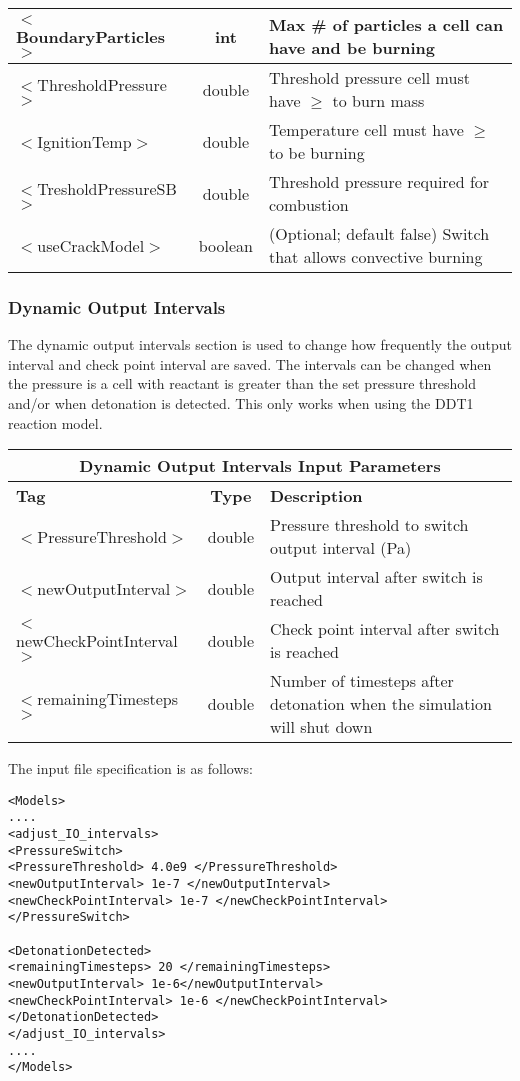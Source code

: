 \begin{center}
\begin{tabular}{| l | c | p{7cm} |}
\hline
  $<$BoundaryParticles$>$ & int & Max \# of particles a cell can have and be burning  \\
\hline
  $<$ThresholdPressure$>$ & double & Threshold pressure cell must have $\ge$ to burn mass \\
\hline
  $<$IgnitionTemp$>$ & double & Temperature cell must have $\ge$ to be burning \\
\hline
  $<$TresholdPressureSB$>$ & double & Threshold pressure required for combustion \\
\hline
  $<$useCrackModel$>$ & boolean & (Optional; default false) Switch that allows convective burning \\
\hline
\end{tabular}
\end{center}



\newpage
\subsubsection{Dynamic Output Intervals} \label {Sec:DDT2}
The dynamic output intervals section is used to change how frequently the output interval and check point interval are saved. The intervals can be changed when the pressure is a cell with reactant is greater than the set pressure threshold and/or when detonation is detected. This only works when using the DDT1 reaction model.


\begin{center}
\begin{tabular}{| l | c | p{7cm} |}
\hline
  \multicolumn{3}{|c|}{\textbf{Dynamic Output Intervals Input Parameters}} \\
\hline
\hline
  \textbf{Tag} & \textbf{Type} & \textbf{Description}\\
\hline
  $<$PressureThreshold$>$ & double & Pressure threshold to switch output interval (Pa)\\
\hline
  $<$newOutputInterval$>$ & double & Output interval after switch is reached\\
\hline
  $<$newCheckPointInterval$>$ & double & Check point interval after switch is reached\\
\hline
  $<$remainingTimesteps$>$ & double & Number of timesteps after detonation when the simulation will shut down\\
\hline
\end{tabular}
\end{center}


The input file specification is as follows:
\begin{lstlisting}
<Models>
....
<adjust_IO_intervals>
<PressureSwitch>
<PressureThreshold> 4.0e9 </PressureThreshold>
<newOutputInterval> 1e-7 </newOutputInterval>
<newCheckPointInterval> 1e-7 </newCheckPointInterval>
</PressureSwitch>

<DetonationDetected>
<remainingTimesteps> 20 </remainingTimesteps>
<newOutputInterval> 1e-6</newOutputInterval>
<newCheckPointInterval> 1e-6 </newCheckPointInterval>
</DetonationDetected>
</adjust_IO_intervals>
....
</Models> 
\end{lstlisting}

